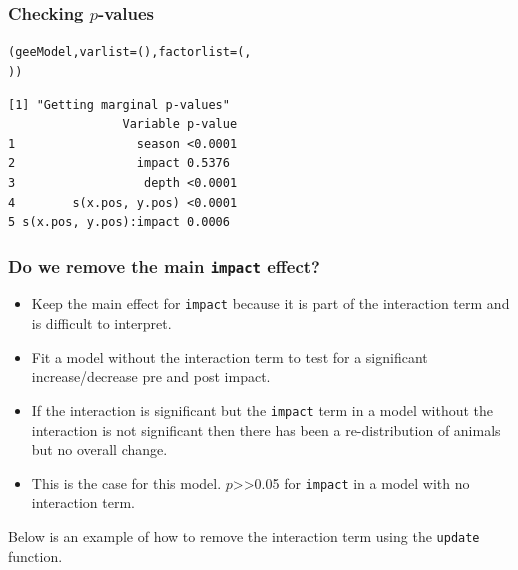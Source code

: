 \begin{frame}[fragile]
\frametitle{Checking $p$-values}
\begin{knitrout}\footnotesize
{}\color{fgcolor}\begin{kframe}
\begin{alltt}
(geeModel, varlist = (), factorlist = (, 
    ))
\end{alltt}
\begin{verbatim}
[1] "Getting marginal p-values"
                Variable p-value
1                 season <0.0001
2                 impact 0.5376
3                  depth <0.0001
4        s(x.pos, y.pos) <0.0001
5 s(x.pos, y.pos):impact 0.0006
\end{verbatim}
\end{kframe}
\end{knitrout}
\end{frame}


\begin{frame}[fragile]
\frametitle{Do we remove the main {\tt impact} effect?}

\begin{itemize}
\item Keep the main effect for {\tt impact} because it is part of the interaction term and is difficult to interpret.\\
\item Fit a model without the interaction term to test for a significant increase/decrease pre and post impact.\\
\item If the interaction is significant but the {\tt impact} term in a model without the interaction is not significant then there has been a re-distribution of animals but no overall change.\\
\item This is the case for this model.  $p$>>0.05 for {\tt impact} in a model with no interaction term.\\
\end{itemize}

\bigskip
Below is an example of how to remove the interaction term using the {\tt update} function.
\end{frame}

